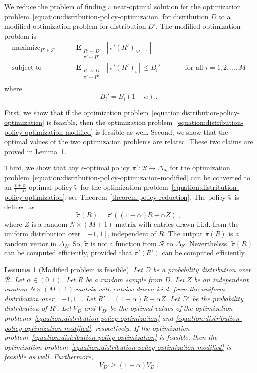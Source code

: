 \documentclass[12pt]{article}
\newcommand{\Requests}{\mathcal{R}}
\renewcommand{\P}{\mathcal{P}}
\DeclareMathOperator*{\Exp}{\mathbf{E}}
\DeclareMathOperator*{\maximize}{maximize}
\DeclareMathOperator*{\subjectto}{subject\ to}
\newtheorem{lemma}[theorem]{Lemma}
\theoremstyle{definition}
\begin{document}
We reduce the problem of finding a near-optimal solution for the
optimization problem~\eqref{equation:distribution-policy-optimization} for distribution
$D$ to a modified optimization problem for distribution $D'$. The modified
optimization problem is
\begin{equation}
\label{equation:distribution-policy-optimization-modified}
\begin{aligned}
\maximize_{P' \in \P} \qquad & \Exp_{\substack{R' \sim D' \\ \pi' \sim P'}} \left[ \pi'(R')_{M+1} \right] \\
\subjectto \qquad & \Exp_{\substack{R' \sim D' \\ \pi' \sim P'}} \left[ \pi'(R')_i \right] \le B_i' && \qquad \text{for all $i=1,2,\dots,M$} \\
\end{aligned}
\end{equation}
where
$$
B_i' = B_i(1 - \alpha) \: .
$$

First, we show that if the optimization
problem~\eqref{equation:distribution-policy-optimization} is feasible, then the
optimization problem~\eqref{equation:distribution-policy-optimization-modified}
is feasible as well. Second, we show that the optimal values of the two
optimization problems are related. These two claims are proved in
Lemma~\ref{lemma:modified-problem-is-feasible}.

Third, we show that any $\epsilon$-optimal policy $\pi':\Requests \to \Delta_N$
for the optimization
problem~\eqref{equation:distribution-policy-optimization-modified} can be
converted to an $\frac{\epsilon + \alpha}{1-\alpha}$-optimal policy
$\widetilde{\pi}$ for the optimization
problem~\eqref{equation:distribution-policy-optimization}; see
Theorem~\ref{theorem:policy-reduction}. The policy $\widetilde{\pi}$ is defined
as
$$
\widetilde{\pi}(R) = \pi'((1-\alpha)R + \alpha Z) \: ,
$$
where $Z$ is a random $N \times (M+1)$ matrix with entries drawn i.i.d. from the
uniform distribution over $[-1,1]$, independent of $R$. The output
$\widetilde{\pi}(R)$ is a random vector in $\Delta_N$. So, $\widetilde{\pi}$ is
not a function from $\Requests$ to $\Delta_N$. Nevertheless,
$\widetilde{\pi}(R)$ can be computed efficiently, provided that $\pi'(R')$ can
be computed efficiently.

\begin{lemma}[Modified problem is feasible]
\label{lemma:modified-problem-is-feasible}
Let $D$ be a probability distribution over $\Requests$. Let $\alpha \in (0,1)$.
Let $R$ be a random sample from $D$. Let $Z$ be an independent random $N \times
(M+1)$ matrix with entries drawn i.i.d. from the uniform distribution over
$[-1,1]$. Let $R' = (1-\alpha)R + \alpha Z$. Let $D'$ be the probability
distribution of $R'$. Let $V_D$ and $V_{D'}$ be the optimal values of the optimization
problems~\eqref{equation:distribution-policy-optimization} and
\eqref{equation:distribution-policy-optimization-modified}, respectively. If the
optimization problem~\eqref{equation:distribution-policy-optimization} is
feasible, then the optimization
problem~\eqref{equation:distribution-policy-optimization-modified} is feasible
as well. Furthermore,
$$
V_{D'} \ge (1 - \alpha) V_D \: .
$$
\end{lemma}
\end{document}
